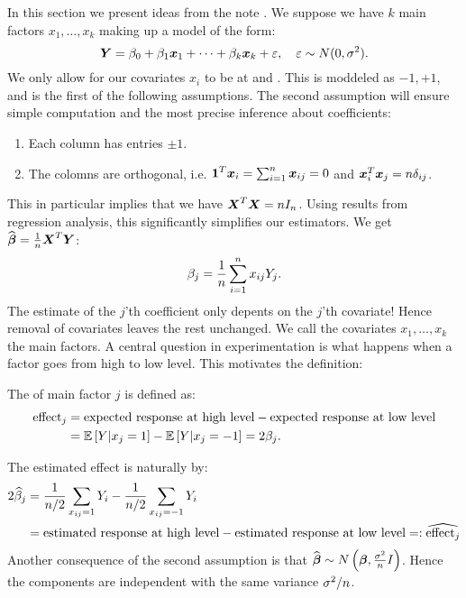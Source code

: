 In this section we present ideas from the note \cite{Tyssedal}. We suppose we have $k$ main factors $x_1,\dots,x_k$ making up a model of the form:
$$
    \boldsymbol{Y}=\beta_0 + \beta_1\boldsymbol{x}_1+\dots+\beta_k\boldsymbol{x}_k + \varepsilon, \quad \varepsilon\sim N(0, \sigma^2).
$$ 
We only allow for our covariates $x_i$ to be at  and . This is moddeled as $-1, +1$, and is the first of the following assumptions. The second assumption will ensure simple computation and the most precise inference about coefficients:
\begin{enumerate}
    \item Each column has entries $\pm 1$.
    \item The colomns are orthogonal, i.e. $\boldsymbol{1}^T\boldsymbol{x}_i=\sum_{i=1}^n \boldsymbol{x}_{ij}=0$ and $\boldsymbol{x}_i^T \boldsymbol{x}_j=n\delta_{ij}$. 
\end{enumerate}
This in particular implies that we have $\boldsymbol{X}^T \boldsymbol{X} = n I_n$. Using results from regression analysis, this significantly simplifies our estimators. We get $\widehat{\boldsymbol{\beta}}=\frac{1}{n} \boldsymbol{X}^T\boldsymbol{Y}$:
\begin{equation*}
    \beta_j = \frac{1}{n} \sum_{i=1}^n x_{ij} Y_j.
\end{equation*}
The estimate of the $j$'th coefficient only depents on the $j$'th covariate! Hence removal of covariates leaves the rest unchanged. We call the covariates $x_1,\dots, x_k$ the main factors. A central question in experimentation is what happens when a factor goes from high to low level. This motivates the definition:
\begin{definition}
    The  of main factor $j$ is defined as:
    \begin{align*}
        \textrm{effect}_j 
        &= \textrm{expected response at high level} - \textrm{expected response at low level} 
        \\&= \mathbb{E}\left[Y | x_{j} = 1\right] - \mathbb{E}\left[Y | x_{j} = -1\right]
        = 2\beta_j.        
    \end{align*}
\end{definition}
The estimated effect is naturally by:
\begin{align*}
    2\widehat{\beta}_j 
    &= \frac{1}{n/2} \sum_{x_{ij} = 1} Y_i - \frac{1}{n/2} \sum_{x_{ij} = - 1} Y_i  
    \\&= \textrm{estimated response at high level} - \textrm{estimated response at low level} 
    =: \widehat{\textrm{effect}_j}
\end{align*}
Another consequence of the second assumption is that $\widehat{\boldsymbol{\beta}} \sim N\left( \boldsymbol{\beta}, \frac{\sigma^2}{n}I \right)$. Hence the components are independent with the same variance $\sigma^2/n$. 

